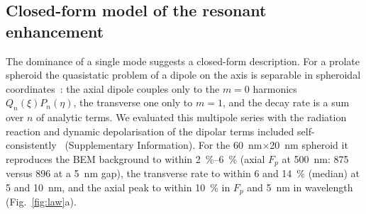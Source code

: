 \documentclass[11pt,a4paper]{article}
\newcommand{\Fp}{F_p}
\begin{document}
\subsection{Closed-form model of the resonant enhancement}
The dominance of a single mode suggests a closed-form description. For a prolate spheroid the quasistatic problem of a
dipole on the axis is separable in spheroidal coordinates~\cite{gersten1981}: the axial dipole couples only to the
$m=0$ harmonics $Q_n(\xi)P_n(\eta)$, the transverse one only to $m=1$, and the decay rate is a sum over $n$ of
analytic terms. We evaluated this multipole series with the radiation reaction and dynamic depolarisation of the
dipolar terms included self-consistently~\cite{kelly2003} (Supplementary Information). For the
\SI{60}{nm}$\times$\SI{20}{nm} spheroid it reproduces the BEM background to within \SIrange{2}{6}{\percent} (axial
$\Fp$ at \SI{500}{nm}: 875 versus 896 at a \SI{5}{nm} gap), the transverse rate to within 6 and \SI{14}{\percent}
(median) at 5 and \SI{10}{nm}, and the axial peak to within \SI{10}{\percent} in $\Fp$ and \SI{5}{nm} in wavelength (Fig.~\ref{fig:law}a).
\end{document}
